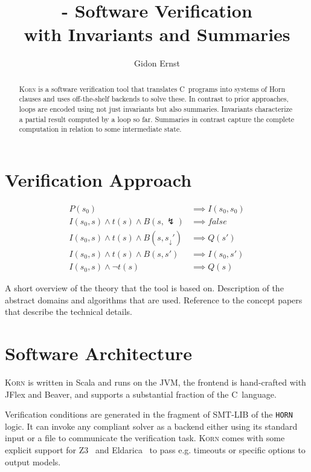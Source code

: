 \documentclass{llncs}
\author{Gidon Ernst}
\title{\Korn - Software Verification \\ with Invariants and Summaries}
\institute{LMU Munich \\ \mailto{gidon.ernst@lmu.de}}
\newcommand{\Korn}{\textsc{Korn}\xspace}
\newcommand{\err}{\lightning}
\newcommand{\brk}[1]{{#1}_\downarrow}
\newcommand{\False}{\mathit{false}}
\begin{document}
\maketitle

\begin{abstract}
    \Korn is a software verification tool that translates
    C~programs into systems of Horn clauses
    and uses off-the-shelf backends to solve these.
    In contrast to prior approaches, loops are encoded using
    not just invariants but also summaries.
    Invariants characterize a partial result computed by a loop so far.
    Summaries in contrast capture the complete computation in relation to some intermediate state.
\end{abstract}

\section{Verification Approach}
\label{sec:approach}

\begin{align*}
    P(s_0)
        & \implies I(s_0,s_0) \\
    I(s_0,s) \land t(s) \land B(s,\err)
        & \implies \False \\
    I(s_0,s) \land t(s) \land B(s,\brk s')
        & \implies Q(s') \\
    I(s_0,s) \land t(s) \land B(s,s')
        & \implies I(s_0,s') \\
    I(s_0,s) \land \lnot t(s)
        & \implies Q(s)
\end{align*}

\cite{hoare1969axiomatic}
A short overview of the theory that the tool is based on. Description of the abstract domains and algorithms that are used. Reference to the concept papers that describe the technical details.

\section{Software Architecture}
\label{sec:architecture}

\Korn is written in Scala and runs on the JVM,
the frontend is hand-crafted with JFlex and Beaver,
and supports a substantial fraction of the C~language.

Verification conditions are generated in the fragment of SMT-LIB of the \texttt{HORN} logic.
It can invoke any compliant solver as a backend either using its standard input or a file to communicate the verification task.
\Korn comes with some explicit support for Z3~\cite{gurfinkel2019science} and Eldarica~\cite{hojjat2018eldarica}
to pass e.g. timeouts or specific options to output models.
\end{document}

